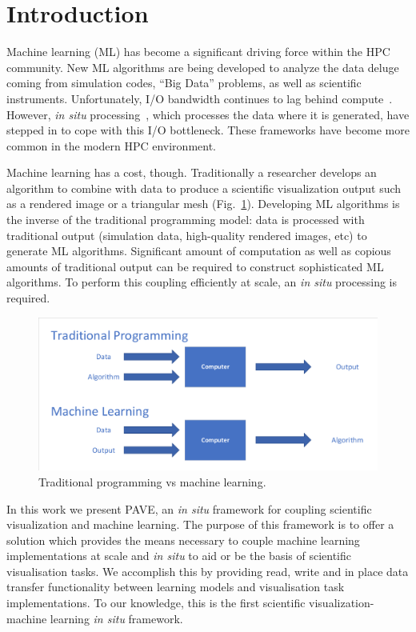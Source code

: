 \section{Introduction}
Machine learning (ML) has become a significant driving force within the HPC community. New ML algorithms are being developed to analyze the data deluge coming from simulation codes, ``Big Data'' problems, as well as scientific instruments. Unfortunately, I/O bandwidth continues to lag behind compute~\cite{7426274}. However, \textit{in situ} processing~\cite{doi:10.1111/cgf.12930}, which processes the data where it is generated, have stepped in to cope with this I/O bottleneck. These frameworks have become more common in the modern HPC environment. 

Machine learning has a cost, though. Traditionally a researcher develops an algorithm to combine with data to produce a scientific visualization output such as a rendered image or a triangular mesh (Fig.~\ref{fig:ml-vs-trad}). Developing ML algorithms is the inverse of the traditional programming model: data is processed with traditional output (simulation data, high-quality rendered images, etc) to generate ML algorithms. Significant amount of computation as well as copious amounts of traditional output can be required to construct sophisticated ML algorithms. To perform this coupling efficiently at scale, an \textit{in situ} processing is required.

\begin{figure}
    \includegraphics[width=\linewidth]{ML-data-output-program}
    \caption{Traditional programming vs machine learning.}
    \label{fig:ml-vs-trad}
  \end{figure}

In this work we present PAVE, an \textit{in situ} framework for coupling scientific visualization and machine learning. The purpose of this framework is to offer a solution which provides the means necessary to couple machine learning implementations at scale and \textit{in situ} to aid or be the basis of scientific visualisation tasks. We accomplish this by providing read, write and in place data transfer functionality between learning models and visualisation task implementations. To our knowledge, this is the first scientific visualization-machine learning \textit{in situ} framework.

